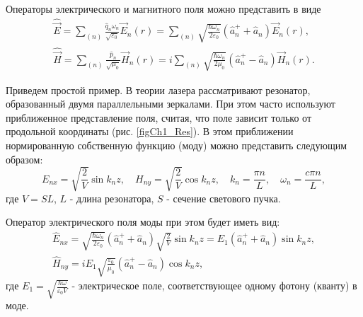 Операторы электрического и магнитного поля можно представить в виде
\begin{eqnarray}
\hat{\vec{E}} = \sum_{(n)}\frac{\hat{q}_n
  \omega_n}{\sqrt{\varepsilon_0}} \vec{E}_n\left(r\right) = 
\sum_{(n)}\sqrt{\frac{\hbar \omega_n}{2 \varepsilon_0}}
\left(\hat{a}_n^{+} + \hat{a}_n \right)
\vec{E}_n\left(r\right),
\nonumber \\
\hat{\vec{H}} = \sum_{(n)}\frac{\hat{p}_n}
{\sqrt{\mu_0}} \vec{H}_n\left(r\right) = 
i \sum_{(n)}\sqrt{\frac{\hbar \omega_n}{2 \mu_0}}
\left(\hat{a}_n^{+} - \hat{a}_n \right)
\vec{H}_n\left(r\right).
\end{eqnarray}

Приведем простой пример. В теории лазера рассматривают резонатор,
образованный двумя параллельными зеркалами. При этом часто
используют приближенное представление поля, считая, что поле
зависит только от продольной координаты (рис. \ref{figCh1_Res}). В
этом приближении нормированную собственную функцию (моду) можно
представить следующим образом: 
\begin{equation}
E_{nx} = \sqrt{\frac{2}{V}} \sin k_n z,
\quad
H_{ny} = \sqrt{\frac{2}{V}} \cos k_n z,
\quad
k_n = \frac{\pi n}{L},
\quad
\omega_n = \frac{c \pi n}{L},
\end{equation}
где  $V = SL$,  $L$ - длина резонатора,  $S$ - сечение светового пучка.



Оператор электрического поля моды при этом будет иметь вид:
\begin{eqnarray}
\hat{E}_{nx} = 
\sqrt{\frac{\hbar \omega_n}{2 \varepsilon_0}}
\left(\hat{a}_n^{+} + \hat{a}_n \right)
\sqrt{\frac{2}{V}} \sin k_n z = 
E_1 \left(\hat{a}_n^{+} + \hat{a}_n \right) \sin k_n z, 
\nonumber \\
\hat{H}_{ny} = i E_1 \sqrt{\frac{\varepsilon_0}{\mu_0}}
\left(\hat{a}_n^{+} - \hat{a}_n \right) \cos k_n z,
\label{eqCh1_EH_simple}
\end{eqnarray}
где 
$E_1 = \sqrt{\frac{\hbar \omega}{\varepsilon_0 V}}$ - 
электрическое поле, соответствующее одному фотону (кванту) в
моде. 
